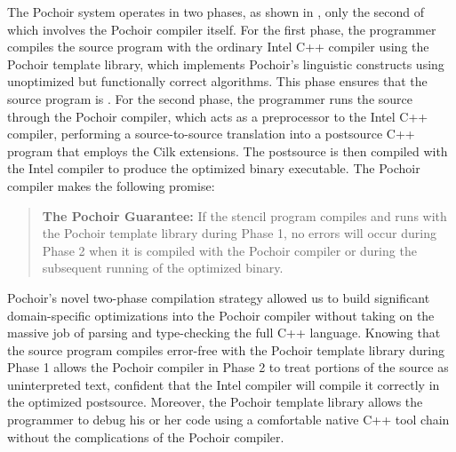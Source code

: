 The Pochoir system operates in two phases, as shown in
, only the second of which involves the Pochoir
compiler itself.  For the first phase, the programmer compiles the
source program with the ordinary Intel C++ compiler using the Pochoir
template library, which implements Pochoir's linguistic constructs
using unoptimized but functionally correct algorithms.  This phase
ensures that the source program is .  For the
second phase, the programmer runs the source through the Pochoir
compiler, which acts as a preprocessor to the Intel C++ compiler,
performing a source-to-source translation into a postsource C++
program that employs the Cilk extensions.  The postsource is then
compiled with the Intel compiler to produce the optimized binary
executable.  The Pochoir compiler makes the following promise:
\begin{quote}
  \textbf{The Pochoir Guarantee:} If the stencil program compiles and
  runs with the Pochoir template library during Phase 1, no errors
  will occur during Phase 2 when it is compiled with the Pochoir
  compiler or during the subsequent running of the optimized binary.
\end{quote}

Pochoir's novel two-phase compilation strategy allowed us to build
significant domain-specific optimizations into the Pochoir compiler
without taking on the massive job of parsing and type-checking the
full C++ language.  Knowing that the source program compiles
error-free with the Pochoir template library during Phase 1 allows the
Pochoir compiler in Phase 2 to treat portions of the source as
uninterpreted text, confident that the Intel compiler will compile it
correctly in the optimized postsource.  Moreover, the Pochoir template
library allows the programmer to debug his or her code using a
comfortable native C++ tool chain without the complications of the
Pochoir compiler.

